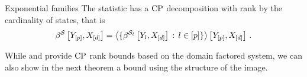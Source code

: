 \begin{example}{Exponential families}
    \label{exa:expFamCP}
    The statistic has a $\mathrm{CP}$ decomposition with rank by the cardinality of states, that is
    \begin{align*}
        \beta^{\mathcal{S}}\left[Y_{[p]},X_{[d]}\right]
        = \left\langle 
            \{ \beta^{\mathcal{S}_{l}}\left[Y_{l},X_{[d]}\right] \, : \, l\in[p] \}
        \right\rangle \left[ Y_{[p]},X_{[d]} \right] \, .
    \end{align*}
\end{example}

While  and  provide $\mathrm{CP}$ rank bounds based on the domain factored system, we can also show in the next theorem a bound using the structure of the image.

